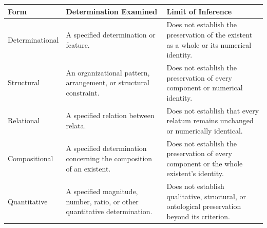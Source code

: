 %
%
%
%

\begin{table}[htbp]
    \centering
    \small
    \renewcommand{\arraystretch}{1.35}
    \setlength{\tabcolsep}{5pt}

    \begin{tabular}{|p{3.0cm}|p{5.2cm}|p{5.2cm}|}
        \hline
        \textbf{Form} &
        \textbf{Determination Examined} &
        \textbf{Limit of Inference}
        \\
        \hline

        Determinational &
        A specified determination or feature. &
        Does not establish the preservation of the
        existent as a whole or its numerical identity.
        \\
        \hline

        Structural &
        An organizational pattern, arrangement,
        or structural constraint. &
        Does not establish the preservation of
        every component or numerical identity.
        \\
        \hline

        Relational &
        A specified relation between relata. &
        Does not establish that every relatum
        remains unchanged or numerically identical.
        \\
        \hline

        Compositional &
        A specified determination concerning
        the composition of an existent. &
        Does not establish the preservation of
        every component or the whole existent's identity.
        \\
        \hline

        Quantitative &
        A specified magnitude, number, ratio,
        or other quantitative determination. &
        Does not establish qualitative, structural,
        or ontological preservation beyond its criterion.
        \\
        \hline


\end{tabular}
\end{table}
